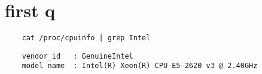 \documentclass{article}
\begin{document}
	\section{first q}

	\begin{verbatim}
	cat /proc/cpuinfo | grep Intel
	\end{verbatim}

	\begin{verbatim}
	vendor_id	: GenuineIntel
	model name	: Intel(R) Xeon(R) CPU E5-2620 v3 @ 2.40GHz
	\end{verbatim}
\end{document}
